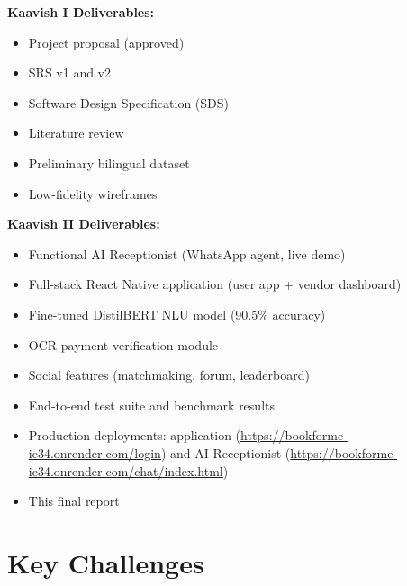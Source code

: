 \noindent\textbf{Kaavish I Deliverables:}
\begin{itemize}
  \item Project proposal (approved)
  \item SRS v1 and v2
  \item Software Design Specification (SDS)
  \item Literature review
  \item Preliminary bilingual dataset
  \item Low-fidelity wireframes
\end{itemize}

\noindent\textbf{Kaavish II Deliverables:}
\begin{itemize}
  \item Functional AI Receptionist (WhatsApp agent, live demo)
  \item Full-stack React Native application (user app + vendor dashboard)
  \item Fine-tuned DistilBERT NLU model (90.5\% accuracy)
  \item OCR payment verification module
  \item Social features (matchmaking, forum, leaderboard)
  \item End-to-end test suite and benchmark results
  \item Production deployments: application (\url{https://bookforme-ie34.onrender.com/login}) and AI Receptionist (\url{https://bookforme-ie34.onrender.com/chat/index.html})
  \item This final report
\end{itemize}

\section{Key Challenges}
\label{sec:intro-challenges}

